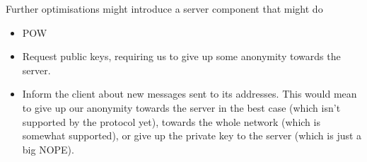 \documentclass{bfh}
\begin{document}
  Further optimisations might introduce a server component that might do
  \begin{itemize}
    \item POW
    \item Request public keys, requiring us to give up some anonymity towards the server.
    \item Inform the client about new messages sent to its addresses. This would mean to give up our anonymity towards the server in the best case (which isn't supported by the protocol yet), towards the whole network (which is somewhat supported), or give up the private key to the server (which is just a big NOPE).
  \end{itemize}
\end{document}
